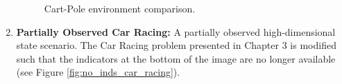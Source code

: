 \begin{enumerate}
    \begin{figure}[H]
    \centering
    \hspace{0.4cm}
    \hspace{1.3cm}
    \captionsetup{justification=centering}
    {
    \setlength{\fboxsep}{0pt}%
    \setlength{\fboxrule}{1pt}%
    }
    \newline
    {
    \setlength{\fboxsep}{0pt}%
    \setlength{\fboxrule}{1pt}%
    }
    \caption{Cart-Pole environment comparison.} 
    \label{fig:cartpoles} 
    \end{figure}    
    
    \item \textbf{Partially Observed Car Racing:} A partially observed high-dimensional state scenario. The Car Racing problem presented in Chapter 3 is modified such that the indicators at the bottom of the image are no longer available (see Figure \ref{fig:no_inds_car_racing}). 
\end{enumerate}

